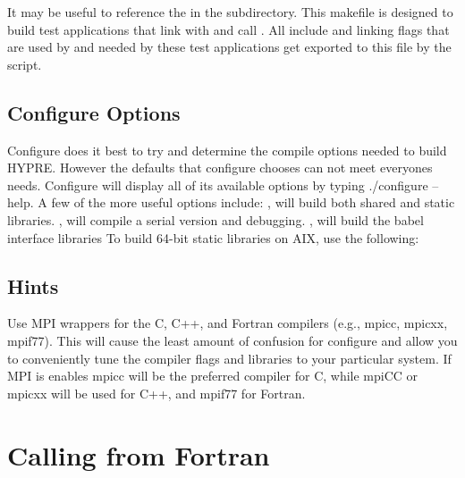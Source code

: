 It may be useful to reference the  in the 
subdirectory.  This makefile is designed to build test applications
that link with and call \hypre{}.  All include and linking flags that
are used by \hypre{} and needed by these test applications get
exported to this file by the  script.

\subsection{Configure Options}

Configure does it best to try and determine the
compile options needed to build HYPRE. However the defaults that
configure chooses can not meet everyones needs. Configure will display
all of its available options by typing ./configure --help. A few of the
more useful options include: 
\linebreak
{}, will build both shared and static libraries. 
, will compile a serial version and debugging.
, will build the babel interface libraries 
To build 64-bit static libraries on AIX, use the following: 
\linebreak
{}

\subsection{Hints}

Use MPI wrappers for the C, C++, and Fortran compilers (e.g.,
mpicc, mpicxx, mpif77).  This will cause the least amount of 
confusion for configure and allow you to conveniently tune the 
compiler flags and libraries to your particular system. If MPI 
is enables mpicc will be the preferred compiler for C, while 
mpiCC or mpicxx will be used for C++, and mpif77 for Fortran.


\section{Calling from Fortran}
\label{Calling from Fortran}

